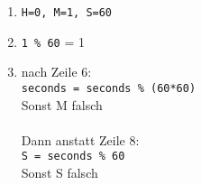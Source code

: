 \begin{enumerate}
	\item \texttt{H=0, M=1, S=60}
	\item  \verb|1 % 60| = 1
	\item nach Zeile 6:\\ \hspace*{1cm}\texttt{seconds = seconds \% (60*60)}\\
	Sonst M falsch\\~\\
	Dann anstatt Zeile 8:\\ \hspace*{1cm}\texttt{S = seconds \% 60}\\
	Sonst S falsch
\end{enumerate}
